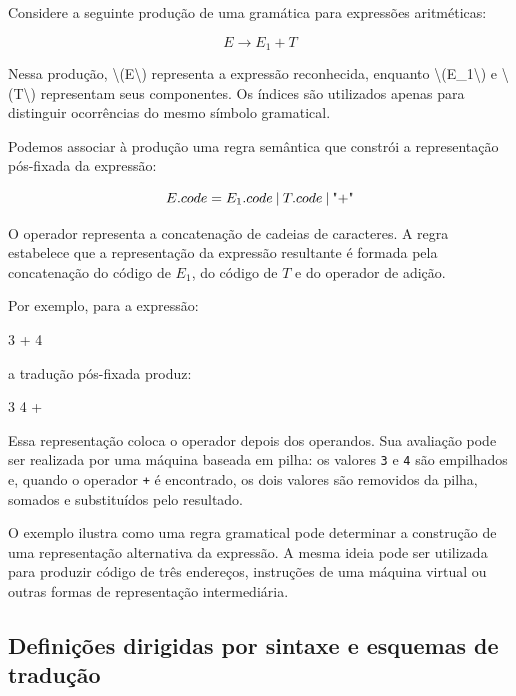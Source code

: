 \documentclass[
  brazilian,
  letterpaper,
]{book}
\newenvironment{Shaded}{\begin{snugshade}}{\end{snugshade}}
\newcommand{\DecValTok}[1]{\textcolor[rgb]{0.68,0.00,0.00}{#1}}
\newcommand{\NormalTok}[1]{\textcolor[rgb]{0.00,0.23,0.31}{#1}}
\newcommand{\OperatorTok}[1]{\textcolor[rgb]{0.37,0.37,0.37}{#1}}
\theoremstyle{plain}
\theoremstyle{definition}
\theoremstyle{remark}
\begin{document}
Considere a seguinte produção de uma gramática para expressões
aritméticas:

\[ E \rightarrow E_1 + T \]

Nessa produção, \textbackslash(E\textbackslash) representa a expressão
reconhecida, enquanto \textbackslash(E\_1\textbackslash) e
\textbackslash(T\textbackslash) representam seus componentes. Os índices
são utilizados apenas para distinguir ocorrências do mesmo símbolo
gramatical.

Podemos associar à produção uma regra semântica que constrói a
representação pós-fixada da expressão:

\[ E.code = E_1.code \mathbin{\\|} T.code \mathbin{\\|} \text{"+"} \]

O operador \texttt{\textbar{}} representa a concatenação de cadeias de
caracteres. A regra estabelece que a representação da expressão
resultante é formada pela concatenação do código de \(E_1\), do código
de \(T\) e do operador de adição.

Por exemplo, para a expressão:

\begin{Shaded}
\begin{Highlighting}[]
\DecValTok{3}\NormalTok{ + }\DecValTok{4}
\end{Highlighting}
\end{Shaded}

a tradução pós-fixada produz:

\begin{Shaded}
\begin{Highlighting}[]
\DecValTok{3} \DecValTok{4} \OperatorTok{+}
\end{Highlighting}
\end{Shaded}

Essa representação coloca o operador depois dos operandos. Sua avaliação
pode ser realizada por uma máquina baseada em pilha: os valores
\texttt{3} e \texttt{4} são empilhados e, quando o operador \texttt{+} é
encontrado, os dois valores são removidos da pilha, somados e
substituídos pelo resultado.

O exemplo ilustra como uma regra gramatical pode determinar a construção
de uma representação alternativa da expressão. A mesma ideia pode ser
utilizada para produzir código de três endereços, instruções de uma
máquina virtual ou outras formas de representação intermediária.

\subsection{Definições dirigidas por sintaxe e esquemas de
tradução}\label{definiuxe7uxf5es-dirigidas-por-sintaxe-e-esquemas-de-traduuxe7uxe3o}
\end{document}
